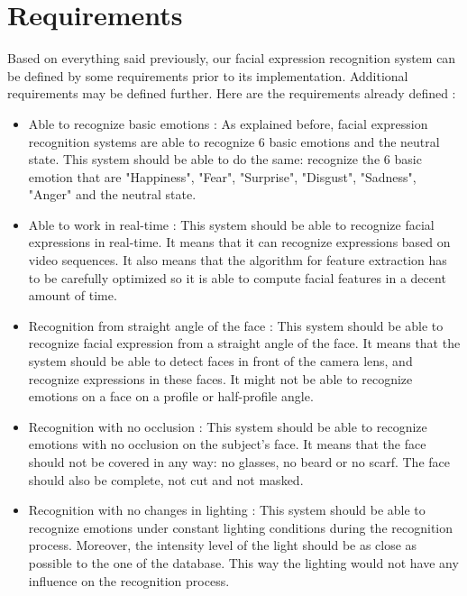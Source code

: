 \section{Requirements}

\vspace{\baselineskip}
\noindent Based on everything said previously, our facial expression recognition system can be defined by some requirements prior to its implementation. Additional requirements may be defined further. Here are the requirements already defined :
\newline

\begin{itemize}
  \item Able to recognize basic emotions : 
  \noindent As explained before, facial expression recognition systems are able to recognize 6 basic emotions and the neutral state. This system should be able to do the same: recognize the 6 basic emotion that are "Happiness", "Fear", "Surprise", "Disgust", "Sadness", "Anger" and the neutral state.
\newline

  \item Able to work in real-time : 
  \noindent This system should be able to recognize facial expressions in real-time. It means that it can recognize expressions based on video sequences. It also means that the algorithm for feature extraction has to be carefully optimized so it is able to compute facial features in a decent amount of time. 
\newline

  \item Recognition from straight angle of the face : 
  \noindent This system should be able to recognize facial expression from a straight angle of the face. It means that the system should be able to detect faces in front of the camera lens, and recognize expressions in these faces. It might not be able to recognize emotions on a face on a profile or half-profile angle.
\newline

  \item Recognition with no occlusion : 
  \noindent This system should be able to recognize emotions with no occlusion on the subject's face. It means that the face should not be covered in any way: no glasses, no beard or no scarf. The face should also be complete, not cut and not masked.
\newline

  \item Recognition with no changes in lighting : 
  \noindent This system should be able to recognize emotions under constant lighting conditions during the recognition process. Moreover, the intensity level of the light should be as close as possible to the one of the database. This way the lighting would not have any influence on the recognition process.
\newline
\end{itemize}











